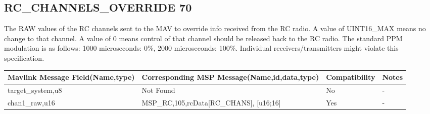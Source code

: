 \cleardoublepage






\subsection{RC\_CHANNELS\_OVERRIDE 70} 
The RAW values of the RC channels sent to the MAV to override info received from the RC radio. A value of UINT16\_MAX means no change to that channel. A value of 0 means control of that channel should be released back to the RC radio. The standard PPM modulation is as follows: 1000 microseconds: 0\%, 2000 microseconds: 100\%. Individual receivers/transmitters might violate this specification.\\

{
\centering
\begin{tabular}{ |p{4cm  } |p{7cm} | p{2cm}|m{5em}|}
\hline
Mavlink Message Field(Name,type)&Corresponding MSP Message(Name,id,data,type)& Compatibility & Notes\\
\hline
target\_system,u8 & Not Found & No & - \\
\hline
\rowcolor{green}
chan1\_raw,u16 & MSP\_RC,105,rcData[RC\_CHANS], [u16;16]& Yes & - \\
\end{tabular}
}

\cleardoublepage

